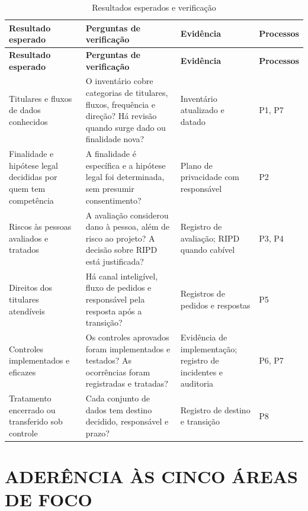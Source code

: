\documentclass[12pt,a4paper,article,oneside,english,brazil]{abntex2}
\makeatletter
\newcommand{\fontetab}[1]{\par\vspace{3pt}{\small\noindent Fonte: #1\par}}
\newcommand{\refnum}[1]{\csname refnum@#1\endcsname}
\newcommand{\cit}[1]{[\refnum{#1}]}
\makeatother
\begin{document}
\begingroup\SingleSpacing\footnotesize
\begin{longtable}{@{}>{\raggedright\arraybackslash}p{}>{\raggedright\arraybackslash}p{}>{\raggedright\arraybackslash}p{}>{\raggedright\arraybackslash}p{}@{}}
\caption{Resultados esperados e verificação}\label{tab:t7}\\
\hline
\textbf{Resultado esperado} & \textbf{Perguntas de verificação} & \textbf{Evidência} & \textbf{Processos}\\
\hline
\endfirsthead
\hline
\textbf{Resultado esperado} & \textbf{Perguntas de verificação} & \textbf{Evidência} & \textbf{Processos}\\
\hline
\endhead
\hline
\endfoot
\hline
\endlastfoot
Titulares e fluxos de dados conhecidos & O inventário cobre categorias de titulares, fluxos, frequência e direção? Há revisão quando surge dado ou finalidade nova? & Inventário atualizado e datado & P1, P7\\[3pt]
Finalidade e hipótese legal decididas por quem tem competência & A finalidade é específica e a hipótese legal foi determinada, sem presumir consentimento? & Plano de privacidade com responsável & P2\\[3pt]
Riscos às pessoas avaliados e tratados & A avaliação considerou dano à pessoa, além de risco ao projeto? A decisão sobre RIPD está justificada? & Registro de avaliação; RIPD quando cabível & P3, P4\\[3pt]
Direitos dos titulares atendíveis & Há canal inteligível, fluxo de pedidos e responsável pela resposta após a transição? & Registros de pedidos e respostas & P5\\[3pt]
Controles implementados e eficazes & Os controles aprovados foram implementados e testados? As ocorrências foram registradas e tratadas? & Evidência de implementação; registro de incidentes e auditoria & P6, P7\\[3pt]
Tratamento encerrado ou transferido sob controle & Cada conjunto de dados tem destino decidido, responsável e prazo? & Registro de destino e transição & P8\\[3pt]
\end{longtable}
\endgroup
\fontetab{Elaborado pelos autores (2026), com base em \cit{pmi}.}

\section{ADERÊNCIA ÀS CINCO ÁREAS DE FOCO}
\end{document}

